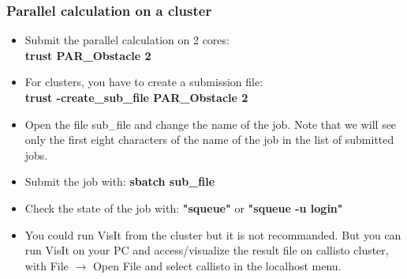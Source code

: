 \documentclass[10pt]{beamer}
\begin{document}
\begin{frame}
\frametitle{Parallel calculation on a cluster}
\begin{block}{}

\begin{itemize}
\item Submit the parallel calculation on 2 cores:\\
\vspace{0.2cm}
\textbf{trust PAR\_Obstacle 2}
\vspace{0.2cm}

\item For clusters, you have to create a submission file:\\
\vspace{0.2cm}
\textbf{trust -create\_sub\_file PAR\_Obstacle 2}
\vspace{0.2cm}

\item Open the file sub\_file and change the name of the job. Note that we will see only the first eight characters of the name of the job in the list of submitted jobs.
\vspace{0.2cm}

\item Submit the job with: \textbf{sbatch sub\_file}
\vspace{0.2cm}

\item Check the state of the job with: \textbf{"squeue"} or \textbf{"squeue -u login"}
\vspace{0.2cm}

\item You could run VisIt from the cluster but it is not recommanded. But you can run VisIt on your PC and access/visualize the result file on callisto cluster, with File $\rightarrow$ Open File and select callisto in the localhost menu.
\end{itemize}

\end{block}
\end{frame}
\end{document}
